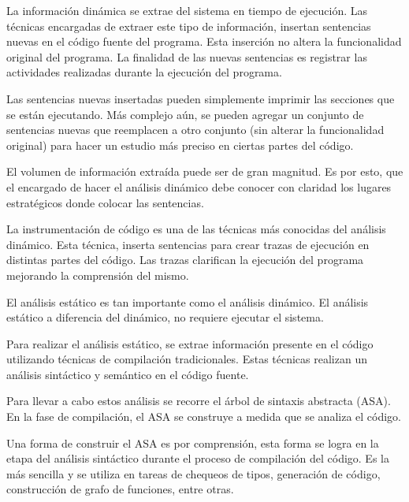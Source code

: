 \documentclass[a4paper,12pt]{report}
\begin{document}
\hspace{0.5cm}La información dinámica se extrae del sistema en tiempo de ejecución. Las técnicas encargadas de extraer este tipo de información, insertan sentencias nuevas en el código fuente del programa. Esta inserción no altera la funcionalidad original del programa. La finalidad de las nuevas sentencias es registrar las actividades realizadas durante la ejecución del programa. 

\hspace{0.5cm}Las sentencias nuevas insertadas pueden simplemente imprimir las secciones que se están ejecutando. Más complejo aún, se pueden agregar un conjunto de sentencias nuevas que reemplacen a otro conjunto (sin alterar la funcionalidad original) para hacer un estudio más preciso en ciertas partes del código.

\hspace{0.5cm}El volumen de información extraída puede ser de gran magnitud. Es por esto, que el encargado de hacer el análisis dinámico debe conocer con claridad los lugares estratégicos donde colocar las sentencias.

\hspace{0.5cm}La instrumentación de código es una de las técnicas más conocidas del análisis dinámico\cite{THBE99}. Esta técnica, inserta sentencias para crear trazas de ejecución en distintas partes del código. Las trazas clarifican la ejecución del programa mejorando la comprensión del mismo.

\hspace{0.5cm}El análisis estático es tan importante como el análisis dinámico. El análisis estático a diferencia del dinámico, no requiere ejecutar el sistema.

\hspace{0.5cm}Para realizar el análisis estático, se extrae información presente en el código utilizando técnicas de compilación tradicionales. Estas técnicas realizan un análisis sintáctico y semántico en el código fuente.

\hspace{0.5cm}Para llevar a cabo estos análisis se recorre el árbol de sintaxis abstracta (ASA)\cite{AHUL06}. En la fase de compilación, el ASA se construye a medida que se analiza el código.

\hspace{0.5cm}Una forma de construir el ASA es por comprensión\cite{AHUL06}, esta forma se logra en la etapa del análisis sintáctico durante el proceso de compilación del código. Es la más sencilla y se utiliza en tareas de chequeos de tipos, generación de código, construcción de grafo de funciones, entre otras.
\end{document}
